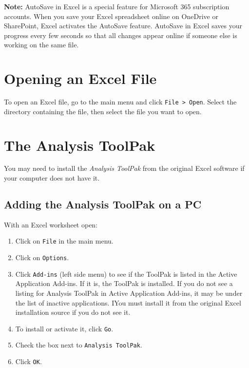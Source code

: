 \documentclass[
  12pt,
  letterpaper,
]{book}
\providecommand{\tightlist}{%
  \setlength{\itemsep}{0pt}\setlength{\parskip}{0pt}}
\begin{document}
\textbf{Note:} AutoSave in Excel is a special feature for Microsoft 365 subscription accounts. When you save your Excel spreadsheet online on OneDrive or SharePoint, Excel activates the AutoSave feature. AutoSave in Excel saves your progress every few seconds so that all changes appear online if someone else is working on the same file.

\hypertarget{opening-an-excel-file}{%
\section{Opening an Excel File}\label{opening-an-excel-file}}

To open an Excel file, go to the main menu and click \texttt{File\ \textgreater{}\ Open}. Select the directory containing the file, then select the file you want to open.

\hypertarget{toolpak}{%
\section{The Analysis ToolPak}\label{toolpak}}

You may need to install the \emph{Analysis ToolPak} from the original Excel software if your computer does not have it.

\hypertarget{adding-the-analysis-toolpak-on-a-pc}{%
\subsection{Adding the Analysis ToolPak on a PC}\label{adding-the-analysis-toolpak-on-a-pc}}

With an Excel worksheet open:

\begin{enumerate}
\def\labelenumi{\arabic{enumi}.}
\tightlist
\item
  Click on \texttt{File} in the main menu.
\item
  Click on \texttt{Options}.
\item
  Click \texttt{Add-ins} (left side menu) to see if the ToolPak is listed in the Active Application Add-ins. If it is, the ToolPak is installed. If you do not see a listing for Analysis ToolPak in Active Application Add-ins, it may be under the list of inactive applications. IYou must install it from the original Excel installation source if you do not see it.
\item
  To install or activate it, click \texttt{Go}.
\item
  Check the box next to \texttt{Analysis\ ToolPak}.
\item
  Click \texttt{OK}.
\end{enumerate}
\end{document}
